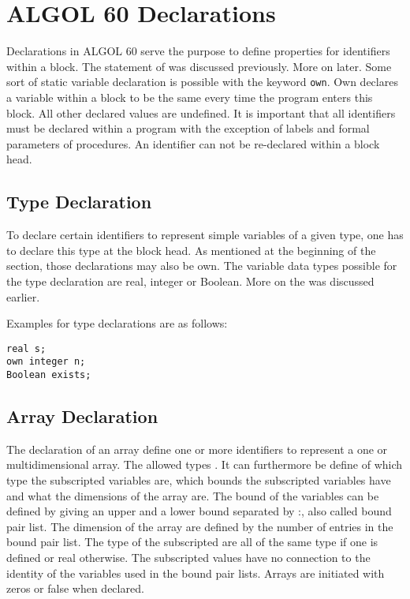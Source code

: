 \documentclass{article}
\begin{document}
\newpage

\section{ALGOL 60 Declarations}
Declarations in ALGOL 60 serve the purpose to define properties for identifiers within a block. The statement of  was discussed previously. More on  later. Some sort of static variable declaration is possible with the keyword \texttt{own}. Own declares a variable within a block to be the same every time the program enters this block. All other declared values are undefined. It is important that all identifiers must be declared within a program with the exception of labels and formal parameters of procedures. An identifier can not be re-declared within a block head. 

\subsection{Type Declaration} \label{typeDecl}
To declare certain identifiers to represent simple variables of a given type, one has to declare this type at the block head. As mentioned at the beginning of the section, those declarations may also be own. The variable data types possible for the type declaration are real, integer or Boolean. More on the  was discussed earlier.

Examples for type declarations are as follows:\\ 
\begin{lstlisting}[language={[60]algol}]
real s;
own integer n;
Boolean exists;
\end{lstlisting}

\subsection{Array Declaration} \label{arrayDecl}
The declaration of an array define one or more identifiers to represent a one or multidimensional array. The allowed types . It can furthermore be define of which type the subscripted variables are, which bounds the subscripted variables have and what the dimensions of the array are. The bound of the variables can be defined by giving an upper and a lower bound separated by :, also called bound pair list. The dimension of the array are defined by the number of entries in the bound pair list. The type of the subscripted are all of the same type if one is defined or real otherwise. The subscripted values have no connection to the identity of the variables used in the bound pair lists. Arrays are initiated with zeros or false when declared.
\end{document}
